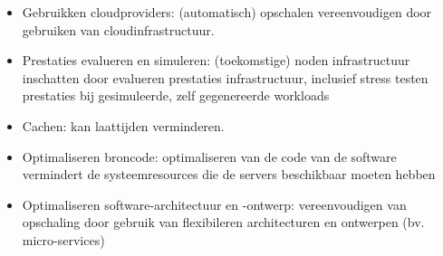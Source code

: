 \begin{itemize}
    \item Gebruikken cloudproviders: (automatisch) opschalen vereenvoudigen
    door gebruiken van cloudinfrastructuur.

    \item Prestaties evalueren en simuleren: (toekomstige) noden infrastructuur
    inschatten door evalueren prestaties infrastructuur, inclusief
    stress testen prestaties bij gesimuleerde, zelf gegenereerde
    workloads 

    \item Cachen: kan laattijden verminderen.

    \item Optimaliseren broncode: optimaliseren van de code van de software
    vermindert de systeemresources die de servers beschikbaar moeten hebben

    \item Optimaliseren software-architectuur en -ontwerp: vereenvoudigen van
    opschaling door gebruik van flexibileren architecturen en ontwerpen 
    (bv. micro-services)

\end{itemize}


